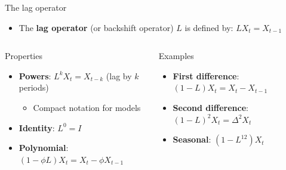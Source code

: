 \documentclass[9pt, aspectratio=169, t]{beamer}
\begin{document}
\begin{frame}{The lag operator}
    \begin{defn}
        \begin{itemize}\setlength{\itemsep}{0pt}
            \item The \textbf{lag operator} (or backshift operator) $L$ is defined by: $LX_t = X_{t-1}$
        \end{itemize}
    \end{defn}

    \begin{columns}[T]
        \begin{block}{Properties}
            \begin{itemize}\setlength{\itemsep}{0pt}
                \item \textbf{Powers}: $L^k X_t = X_{t-k}$ (lag by $k$ periods)
                \begin{itemize}
                    \item Compact notation for models
                \end{itemize}
                \item \textbf{Identity}: $L^0 = I$
                \item \textbf{Polynomial}: $(1 - \phi L)X_t = X_t - \phi X_{t-1}$
            \end{itemize}
        \end{block}
        \begin{exampleblock}{Examples}
            \begin{itemize}\setlength{\itemsep}{0pt}
                \item \textbf{First difference}: $(1-L)X_t = X_t - X_{t-1}$
                \item \textbf{Second difference}: $(1-L)^2 X_t = \Delta^2 X_t$
                \item \textbf{Seasonal}: $(1-L^{12})X_t$
            \end{itemize}
        \end{exampleblock}
    \end{columns}
\end{frame}
\end{document}

